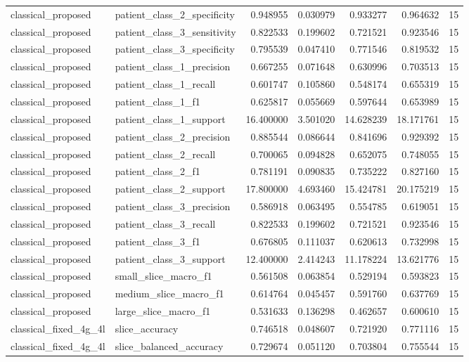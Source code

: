 \begin{tabular}{llrrrrr}
classical_proposed & patient_class_2_specificity & 0.948955 & 0.030979 & 0.933277 & 0.964632 & 15 \\
classical_proposed & patient_class_3_sensitivity & 0.822533 & 0.199602 & 0.721521 & 0.923546 & 15 \\
classical_proposed & patient_class_3_specificity & 0.795539 & 0.047410 & 0.771546 & 0.819532 & 15 \\
classical_proposed & patient_class_1_precision & 0.667255 & 0.071648 & 0.630996 & 0.703513 & 15 \\
classical_proposed & patient_class_1_recall & 0.601747 & 0.105860 & 0.548174 & 0.655319 & 15 \\
classical_proposed & patient_class_1_f1 & 0.625817 & 0.055669 & 0.597644 & 0.653989 & 15 \\
classical_proposed & patient_class_1_support & 16.400000 & 3.501020 & 14.628239 & 18.171761 & 15 \\
classical_proposed & patient_class_2_precision & 0.885544 & 0.086644 & 0.841696 & 0.929392 & 15 \\
classical_proposed & patient_class_2_recall & 0.700065 & 0.094828 & 0.652075 & 0.748055 & 15 \\
classical_proposed & patient_class_2_f1 & 0.781191 & 0.090835 & 0.735222 & 0.827160 & 15 \\
classical_proposed & patient_class_2_support & 17.800000 & 4.693460 & 15.424781 & 20.175219 & 15 \\
classical_proposed & patient_class_3_precision & 0.586918 & 0.063495 & 0.554785 & 0.619051 & 15 \\
classical_proposed & patient_class_3_recall & 0.822533 & 0.199602 & 0.721521 & 0.923546 & 15 \\
classical_proposed & patient_class_3_f1 & 0.676805 & 0.111037 & 0.620613 & 0.732998 & 15 \\
classical_proposed & patient_class_3_support & 12.400000 & 2.414243 & 11.178224 & 13.621776 & 15 \\
classical_proposed & small_slice_macro_f1 & 0.561508 & 0.063854 & 0.529194 & 0.593823 & 15 \\
classical_proposed & medium_slice_macro_f1 & 0.614764 & 0.045457 & 0.591760 & 0.637769 & 15 \\
classical_proposed & large_slice_macro_f1 & 0.531633 & 0.136298 & 0.462657 & 0.600610 & 15 \\
classical_fixed_4g_4l & slice_accuracy & 0.746518 & 0.048607 & 0.721920 & 0.771116 & 15 \\
classical_fixed_4g_4l & slice_balanced_accuracy & 0.729674 & 0.051120 & 0.703804 & 0.755544 & 15 \\

\end{tabular}
